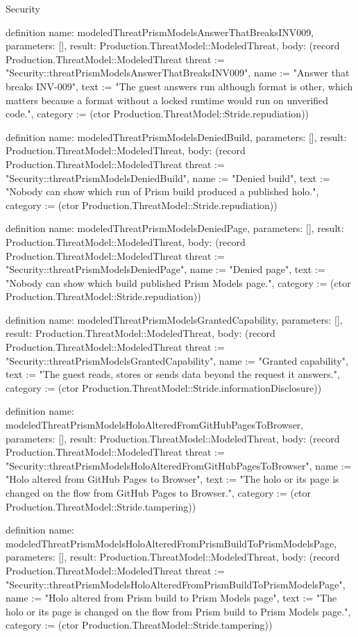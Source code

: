 \begin{lexlean}{Security}
\begin{semanticmodule}
definition{
  name: modeledThreatPrismModelsAnswerThatBreaksINV009,
  parameters: [],
  result: Production.ThreatModel::ModeledThreat,
  body: (record Production.ThreatModel::ModeledThreat {threat := "Security::threatPrismModelsAnswerThatBreaksINV009", name := "Answer that breaks INV-009", text := "The guest answers run although format is other, which matters because a format without a locked runtime would run on unverified code.", category := (ctor Production.ThreatModel::Stride.repudiation)})
}

definition{
  name: modeledThreatPrismModelsDeniedBuild,
  parameters: [],
  result: Production.ThreatModel::ModeledThreat,
  body: (record Production.ThreatModel::ModeledThreat {threat := "Security::threatPrismModelsDeniedBuild", name := "Denied build", text := "Nobody can show which run of Prism build produced a published holo.", category := (ctor Production.ThreatModel::Stride.repudiation)})
}

definition{
  name: modeledThreatPrismModelsDeniedPage,
  parameters: [],
  result: Production.ThreatModel::ModeledThreat,
  body: (record Production.ThreatModel::ModeledThreat {threat := "Security::threatPrismModelsDeniedPage", name := "Denied page", text := "Nobody can show which build published Prism Models page.", category := (ctor Production.ThreatModel::Stride.repudiation)})
}

definition{
  name: modeledThreatPrismModelsGrantedCapability,
  parameters: [],
  result: Production.ThreatModel::ModeledThreat,
  body: (record Production.ThreatModel::ModeledThreat {threat := "Security::threatPrismModelsGrantedCapability", name := "Granted capability", text := "The guest reads, stores or sends data beyond the request it answers.", category := (ctor Production.ThreatModel::Stride.informationDisclosure)})
}

definition{
  name: modeledThreatPrismModelsHoloAlteredFromGitHubPagesToBrowser,
  parameters: [],
  result: Production.ThreatModel::ModeledThreat,
  body: (record Production.ThreatModel::ModeledThreat {threat := "Security::threatPrismModelsHoloAlteredFromGitHubPagesToBrowser", name := "Holo altered from GitHub Pages to Browser", text := "The holo or its page is changed on the flow from GitHub Pages to Browser.", category := (ctor Production.ThreatModel::Stride.tampering)})
}

definition{
  name: modeledThreatPrismModelsHoloAlteredFromPrismBuildToPrismModelsPage,
  parameters: [],
  result: Production.ThreatModel::ModeledThreat,
  body: (record Production.ThreatModel::ModeledThreat {threat := "Security::threatPrismModelsHoloAlteredFromPrismBuildToPrismModelsPage", name := "Holo altered from Prism build to Prism Models page", text := "The holo or its page is changed on the flow from Prism build to Prism Models page.", category := (ctor Production.ThreatModel::Stride.tampering)})
}


\end{semanticmodule}
\end{lexlean}
